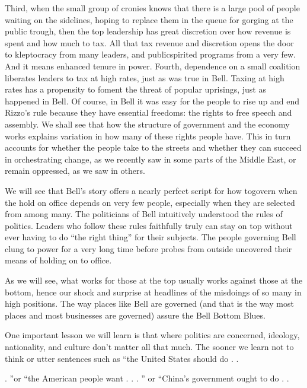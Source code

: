 \documentclass[10pt]{article}
\begin{document}
{\large Third, when the small group of cronies knows that there is a large pool
of people waiting on the sidelines, hoping to replace them in the queue for
gorging at the public trough, then the top leadership has great discretion over
how revenue is spent and how much to tax. All that tax revenue and discretion
opens the door to kleptocracy from many leaders, and publicspirited programs from
a very few. And it means enhanced tenure in power. Fourth, dependence on a small
coalition liberates leaders to tax at high rates, just as was true in Bell.
Taxing at high rates has a propensity to foment the threat of popular uprisings,
just as happened in Bell. Of course, in Bell it was easy for the people to rise
up and end Rizzo's rule because they have essential freedoms: the rights to free
speech and assembly. We shall see that how the structure of government and the
economy works explains variation in how many of these rights people have. This in
turn accounts for whether the people take to the streets and whether they can
succeed in orchestrating change, as we recently saw in some parts of the Middle
East, or remain oppressed, as we saw in others.}

{\large We will see that Bell's story offers a nearly perfect script for how
togovern when the hold on office depends on very few people, especially when they
are selected from among many. The politicians of Bell intuitively understood the
rules of politics. Leaders who follow these rules faithfully truly can stay on
top without ever having to do ``the right thing'' for their subjects. The people
governing Bell clung to power for a very long time before probes from outside
uncovered their means of holding on to office.}

{\large As we will see, what works for those at the top usually works against
those at the bottom, hence our shock and surprise at headlines of the misdoings
of so many in high positions. The way places like Bell are governed (and that is
the way most places and most businesses are governed) assure the Bell Bottom
Blues.}

{\large One important lesson we will learn is that where politics are concerned,
ideology, nationality, and culture don't matter all that much. The sooner we
learn not to think or utter sentences such as ``the United States should do . .}

{\large . ''or ``the American people want . . . '' or ``China's government ought
to do . .}
\end{document}
